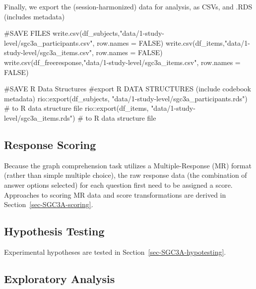 \documentclass[
  letterpaper,
  DIV=11,
  numbers=noendperiod]{scrreprt}
\newenvironment{Shaded}{\begin{snugshade}}{\end{snugshade}}
\newcommand{\AttributeTok}[1]{\textcolor[rgb]{0.40,0.45,0.13}{#1}}
\newcommand{\CommentTok}[1]{\textcolor[rgb]{0.37,0.37,0.37}{#1}}
\newcommand{\ConstantTok}[1]{\textcolor[rgb]{0.56,0.35,0.01}{#1}}
\newcommand{\FunctionTok}[1]{\textcolor[rgb]{0.28,0.35,0.67}{#1}}
\newcommand{\NormalTok}[1]{\textcolor[rgb]{0.00,0.23,0.31}{#1}}
\newcommand{\SpecialCharTok}[1]{\textcolor[rgb]{0.37,0.37,0.37}{#1}}
\newcommand{\StringTok}[1]{\textcolor[rgb]{0.13,0.47,0.30}{#1}}
\begin{document}
Finally, we export the (session-harmonized) data for analysis, as CSVs,
and .RDS (includes metadata)

\begin{Shaded}
\begin{Highlighting}[]
\CommentTok{\#SAVE FILES}
\FunctionTok{write.csv}\NormalTok{(df\_subjects,}\StringTok{"data/1{-}study{-}level/sgc3a\_participants.csv"}\NormalTok{, }\AttributeTok{row.names =} \ConstantTok{FALSE}\NormalTok{)}
\FunctionTok{write.csv}\NormalTok{(df\_items,}\StringTok{"data/1{-}study{-}level/sgc3a\_items.csv"}\NormalTok{, }\AttributeTok{row.names =} \ConstantTok{FALSE}\NormalTok{)}
\FunctionTok{write.csv}\NormalTok{(df\_freeresponse,}\StringTok{"data/1{-}study{-}level/sgc3a\_items.csv"}\NormalTok{, }\AttributeTok{row.names =} \ConstantTok{FALSE}\NormalTok{)}

\CommentTok{\#SAVE R Data Structures }
\CommentTok{\#export R DATA STRUCTURES (include codebook metadata)}
\NormalTok{rio}\SpecialCharTok{::}\FunctionTok{export}\NormalTok{(df\_subjects, }\StringTok{"data/1{-}study{-}level/sgc3a\_participants.rds"}\NormalTok{) }\CommentTok{\# to R data structure file}
\NormalTok{rio}\SpecialCharTok{::}\FunctionTok{export}\NormalTok{(df\_items, }\StringTok{"data/1{-}study{-}level/sgc3a\_items.rds"}\NormalTok{) }\CommentTok{\# to R data structure file}
\end{Highlighting}
\end{Shaded}

\hypertarget{response-scoring}{%
\subsection{Response Scoring}\label{response-scoring}}

Because the graph comprehension task utilizes a Multiple-Response (MR)
format (rather than simple multiple choice), the raw response data (the
combination of answer options selected) for each question first need to
be assigned a score. Approaches to scoring MR data and score
transformations are derived in Section~\ref{sec-SGC3A-scoring}.

\hypertarget{hypothesis-testing}{%
\subsection{Hypothesis Testing}\label{hypothesis-testing}}

Experimental hypotheses are tested in
Section~\ref{sec-SGC3A-hypotesting}.

\hypertarget{exploratory-analysis}{%
\subsection{Exploratory Analysis}\label{exploratory-analysis}}
\end{document}
